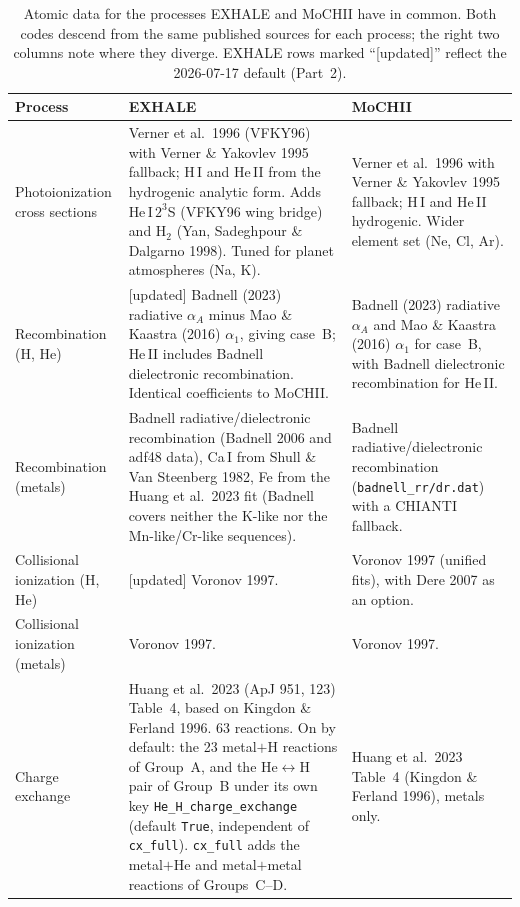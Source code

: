 \documentclass[english,a4paper]{my_memo}
\newcommand{\bk}{\discretionary{}{}{}}
\newcommand{\code}[1]{\texttt{#1}}
\begin{document}
\begin{table}[htbp]
\centering
\footnotesize
\renewcommand{\arraystretch}{1.25}
\caption{Atomic data for the processes EXHALE and MoCHII have in common.
Both codes descend from the same published sources for each process; the
right two columns note where they diverge. EXHALE rows marked
``[updated]'' reflect the 2026-07-17 default (Part~2).}
\label{tab:overlap}
\begin{tabular}{@{}p{}p{}p{}@{}}
\toprule
\textbf{Process} & \textbf{EXHALE} & \textbf{MoCHII} \\
\midrule
Photoionization cross sections &
Verner et al.\ 1996 (VFKY96) with Verner \& Yakovlev 1995 fallback; H\,I
and He\,II from the hydrogenic analytic form. Adds He\,I\,$2^3$S (VFKY96
wing bridge) and H$_2$ (Yan, Sadeghpour \& Dalgarno 1998). Tuned for
planet atmospheres (Na, K). &
Verner et al.\ 1996 with Verner \& Yakovlev 1995 fallback; H\,I and
He\,II hydrogenic. Wider element set (Ne, Cl, Ar). \\

Recombination (H, He) &
[updated] Badnell (2023) radiative $\alpha_A$ minus Mao \& Kaastra (2016)
$\alpha_1$, giving case~B; He\,II includes Badnell dielectronic
recombination. Identical coefficients to MoCHII. &
Badnell (2023) radiative $\alpha_A$ and Mao \& Kaastra (2016) $\alpha_1$
for case~B, with Badnell dielectronic recombination for He\,II. \\

Recombination (metals) &
Badnell radiative/dielectronic recombination (Badnell 2006 and adf48
data), Ca\,I from Shull \& Van Steenberg 1982, Fe from the Huang et al.\
2023 fit (Badnell covers neither the K-like nor the Mn-like/Cr-like
sequences). &
Badnell radiative/dielectronic recombination
(\code{badnell\_rr/dr.dat}) with a CHIANTI fallback. \\

Collisional ionization (H, He) &
[updated] Voronov 1997. &
Voronov 1997 (unified fits), with Dere 2007 as an option. \\

Collisional ionization (metals) &
Voronov 1997. &
Voronov 1997. \\

Charge exchange &
Huang et al.\ 2023 (ApJ 951, 123) Table~4, based on Kingdon \& Ferland
1996. 63 reactions. On by default: the 23 metal$+$H reactions of Group~A,
and the He$\leftrightarrow$H pair of Group~B under its own key
\code{He\_H\_}\bk{}\code{charge\_}\bk{}\code{exchange} (default \code{True},
independent of \code{cx\_full}). \code{cx\_full} adds the
metal$+$He and metal$+$metal reactions of Groups~C--D. &
Huang et al.\ 2023 Table~4 (Kingdon \& Ferland 1996), metals only. \\


\end{tabular}
\end{table}
\end{document}
